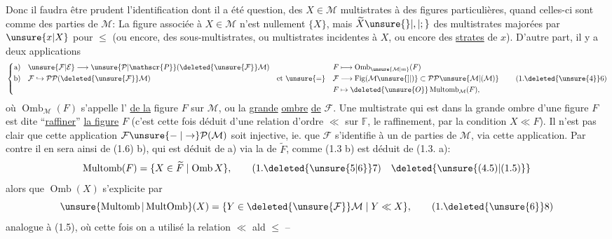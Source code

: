 Donc il faudra être prudent   l'identification dont il a été question, des $X\in\mathcal{M}$  multistrates à des figures particulières, quand celles-ci sont  comme des parties de $\mathcal{M}$: La figure associée à $X\in\mathcal{M}$ n'est nullement $\{X\}$, mais $\widetilde X\unsure{\rbrace|,|;}$   des multistrates majorées par $\unsure{x|X}$ pour $\leq$ (ou encore, des sous-multistrates, ou multistrates incidentes à $X$, ou encore des  \uline{strates} de $x$).
D'autre part, il y a deux  applications
\[
\left\{\begin{aligned}
\text{a)}\quad &\unsure{\mathcal{F}|\mathcal{E}}\longrightarrow\unsure{\mathcal{P}|\mathscr{P}}(\deleted{\unsure{\mathcal{F}}}\mathcal{M})&
 F&\longmapsto\operatorname{Omb}_{\unsure{\mathcal{M}|m}}(F)\\
\text{b)}\quad &\mathcal{F}\hookrightarrow\mathcal{P}\mathcal{P}(\deleted{\unsure{\mathcal{F}}}\mathcal{M})&
 \text{et }\unsure{=}\quad\mathcal{F}&\longrightarrow\operatorname{Fig}(\mathcal{M}\unsure{]|)}\subset\mathcal{P}\mathcal{P}\unsure{\mathcal{M}|(\mathcal{M})}\\
&& F&\mapsto\deleted{\unsure{O}}\operatorname{Multomb}_{\mathcal{M}}(F),
\end{aligned}\right.\tag*{(1.\deleted{\unsure{4}}6)}
\]
où $\operatorname{Omb}_{\mathcal{M}}(F)$ s'appelle l'\uline{} \uline{de la} figure $F$ sur $\mathcal{M}$, ou la \uline{grande} \uline{ombre} \uline{de} $\mathcal{F}$. Une multistrate  qui est dans la grande ombre d'une figure $F$ est dite ``\uline{raffiner}'' \uline{la figure} $F$ (c'est cette fois déduit d'une relation d'ordre $\ll$ sur $\mathbb{F}$, le raffinement, par la condition $X\ll F$). Il n'est pas clair que cette application $\mathcal{F}\unsure{\relbar|\to}\mathcal{P}(\mathcal{M})$ soit injective, ie. que $\mathcal{F}$ s'identifie à un  de parties de $\mathcal{M}$, via cette application. Par contre il en sera ainsi de (1.6) b), qui est déduit de a) via la  de $\widetilde F$, comme (1.3 b) est déduit de (1.3. a):
\[
\operatorname{Multomb}(F)=\{X\in\widetilde F\mid\operatorname{Omb}X\},\tag*{(1.\deleted{\unsure{5|6}}7)\quad\deleted{\unsure{(4.5)|(1.5)}}}
\]
alors que $\operatorname{Omb}(X)$ s'explicite par
\[
\unsure{\operatorname{Multomb}|\operatorname{MultOmb}}(X)=\{Y\in\deleted{\unsure{\mathcal{F}}}\mathcal{M}\mid Y\ll X\},\tag*{(1.\deleted{\unsure{6}}8)}
\]
analogue à (1.5), où cette fois on a utilisé la relation  $\ll$ ald $\leq$ -- 

